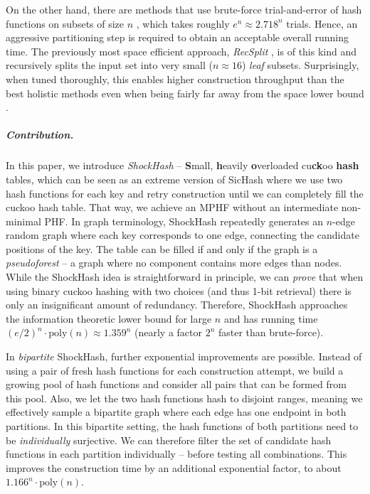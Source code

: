 \documentclass[a4paper,USenglish,cleveref]{lipics-v2021}
\newcommand{\myparagraph}[1]{\subparagraph*{#1}}
\begin{document}
On the other hand, there are methods that use brute-force trial-and-error of hash functions on subsets of size $n$ \cite{esposito2020recsplit,bez2023high,fox1992faster,belazzougui2009hash,pibiri2021pthash}, which takes roughly $e^n \approx 2.718^n$ trials.
Hence, an aggressive partitioning step is required to obtain an acceptable overall running time.
The previously most space efficient approach, \emph{RecSplit} \cite{esposito2020recsplit}, is of this kind and recursively splits the input set into very small ($n\approx 16$) \emph{leaf} subsets.
Surprisingly, when tuned thoroughly, this enables higher construction throughput than the best holistic methods even when being fairly far away from the space lower bound \cite{bez2023high}.

\myparagraph{Contribution.}
In this paper, we introduce \emph{ShockHash} -- {\bf S}mall, {\bf h}eavily {\bf o}verloaded cu{\bf ck}oo {\bf hash} tables, which can be seen as an extreme version of SicHash where we use two hash functions for each key and retry construction until we can completely fill the cuckoo hash table.
That way, we achieve an MPHF without an intermediate non-minimal PHF.
In graph terminology, ShockHash repeatedly generates an $n$-edge random graph where each key corresponds to one edge, connecting the candidate positions of the key.
The table can be filled if and only if the graph is a \emph{pseudoforest} -- a graph where no component contains more edges than nodes.
While the ShockHash idea is straightforward in principle, we can \emph{prove} that when using binary cuckoo hashing with two choices (and thus 1-bit retrieval) there is only an insignificant amount of redundancy.
Therefore, ShockHash approaches the information theoretic lower bound for large $n$ and has running time $(e/2)^n\cdot\textrm{poly}(n) \approx 1.359^n$ (nearly a factor $2^n$ faster than brute-force).

In \emph{bipartite} ShockHash, further exponential improvements are possible.
Instead of using a pair of fresh hash functions for each construction attempt, we build a growing pool of hash functions and consider all pairs that can be formed from this pool.
Also, we let the two hash functions hash to disjoint ranges, meaning we effectively sample a bipartite graph where each edge has one endpoint in both partitions.
In this bipartite setting, the hash functions of both partitions need to be \emph{individually} surjective.
We can therefore filter the set of candidate hash functions in each partition individually -- before testing all combinations.
This improves the construction time by an additional exponential factor, to about $1.166^n\cdot\textrm{poly}(n)$.
\end{document}
